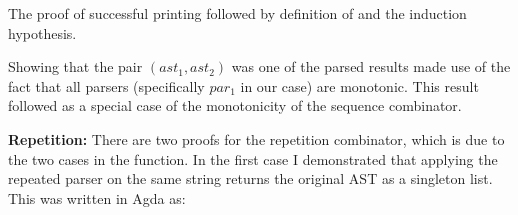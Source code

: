 \documentclass[12pt,a4paper,twoside,openright]{report}
\newcommand{\F}{\AgdaFunction}
\begin{document}

\begin{code}
\> \AgdaSymbol{:} 
\>[15]       \<%
\\
\>[4]\<[15]%
\>[15]         \<%
\\
\>[4]\<[15]%
\>[15]         \<%
\\
\>[4]\<[15]%
\>[15]  \AgdaSymbol{=}   \<%
\\
\>[15]\<[19]%
\>[19] \AgdaSymbol{=}   \<%
\\
\>[0]\<[15]%
\>[15] \<[19]%
\>[19]  \AgdaInductiveConstructor{,}        \AgdaFunction{++}  \<%
\end{code}

The proof of successful printing followed by definition of \F{liftM2} and the induction hypothesis.

Showing that the pair {$(ast_1 , ast_2)$} was one of the parsed results made use of the fact that all parsers (specifically {$par_1$} in our case) are monotonic. This result followed as a special case of the monotonicity of the sequence combinator.

{\bf Repetition:} There are two proofs for the repetition combinator, which is due to the two cases in the \F{parseList} function.  
In the first case I demonstrated that applying the repeated parser on the same string returns the original AST as a singleton list. This was written in Agda as:
\end{document}
